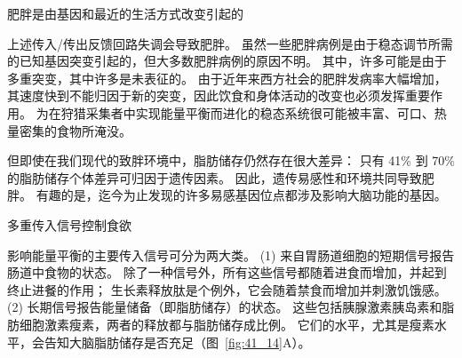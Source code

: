 肥胖是由基因和最近的生活方式改变引起的

上述传入/传出反馈回路失调会导致肥胖。
虽然一些肥胖病例是由于稳态调节所需的已知基因突变引起的，但大多数肥胖病例的原因不明。
其中，许多可能是由于多重突变，其中许多是未表征的。
由于近年来西方社会的肥胖发病率大幅增加，其速度快到不能归因于新的突变，因此饮食和身体活动的改变也必须发挥重要作用。
为在狩猎采集者中实现能量平衡而进化的稳态系统很可能被丰富、可口、热量密集的食物所淹没。


但即使在我们现代的致胖环境中，脂肪储存仍然存在很大差异：
只有 41\% 到 70\% 的脂肪储存个体差异可归因于遗传因素。
因此，遗传易感性和环境共同导致肥胖。
有趣的是，迄今为止发现的许多易感基因位点都涉及影响大脑功能的基因。


多重传入信号控制食欲

影响能量平衡的主要传入信号可分为两大类。
(1) 来自胃肠道细胞的短期信号报告肠道中食物的状态。
除了一种信号外，所有这些信号都随着进食而增加，并起到终止进餐的作用；
生长素释放肽是个例外，它会随着禁食而增加并刺激饥饿感。
(2) 长期信号报告能量储备（即脂肪储存）的状态。 
这些包括胰腺激素胰岛素和脂肪细胞激素瘦素，两者的释放都与脂肪储存成比例。
它们的水平，尤其是瘦素水平，会告知大脑脂肪储存是否充足（图~\ref{fig:41_14}A）。


